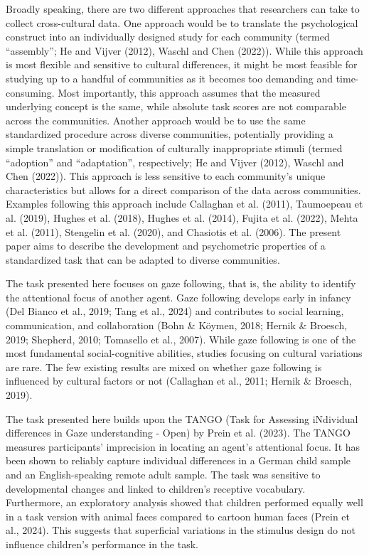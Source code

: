 \documentclass[
  man,floatsintext]{apa7}
\begin{document}
Broadly speaking, there are two different approaches that researchers can take to collect cross-cultural data.
One approach would be to translate the psychological construct into an individually designed study for each community (termed ``assembly''; He and Vijver (2012), Waschl and Chen (2022)).
While this approach is most flexible and sensitive to cultural differences, it might be most feasible for studying up to a handful of communities as it becomes too demanding and time-consuming.
Most importantly, this approach assumes that the measured underlying concept is the same, while absolute task scores are not comparable across the communities.
Another approach would be to use the same standardized procedure across diverse communities, potentially providing a simple translation or modification of culturally inappropriate stimuli (termed ``adoption'' and ``adaptation'', respectively; He and Vijver (2012), Waschl and Chen (2022)).
This approach is less sensitive to each community's unique characteristics but allows for a direct comparison of the data across communities.
Examples following this approach include Callaghan et al. (2011), Taumoepeau et al. (2019), Hughes et al. (2018), Hughes et al. (2014), Fujita et al. (2022), Mehta et al. (2011), Stengelin et al. (2020), and Chasiotis et al. (2006).
The present paper aims to describe the development and psychometric properties of a standardized task that can be adapted to diverse communities.

The task presented here focuses on gaze following, that is, the ability to identify the attentional focus of another agent.
Gaze following develops early in infancy (Del Bianco et al., 2019; Tang et al., 2024) and contributes to social learning, communication, and collaboration (Bohn \& Köymen, 2018; Hernik \& Broesch, 2019; Shepherd, 2010; Tomasello et al., 2007).
While gaze following is one of the most fundamental social-cognitive abilities, studies focusing on cultural variations are rare.
The few existing results are mixed on whether gaze following is influenced by cultural factors or not (Callaghan et al., 2011; Hernik \& Broesch, 2019).

The task presented here builds upon the TANGO (Task for Assessing iNdividual differences in Gaze understanding - Open) by Prein et al. (2023).
The TANGO measures participants' imprecision in locating an agent's attentional focus.
It has been shown to reliably capture individual differences in a German child sample and an English-speaking remote adult sample.
The task was sensitive to developmental changes and linked to children's receptive vocabulary.
Furthermore, an exploratory analysis showed that children performed equally well in a task version with animal faces compared to cartoon human faces (Prein et al., 2024).
This suggests that superficial variations in the stimulus design do not influence children's performance in the task.
\end{document}

